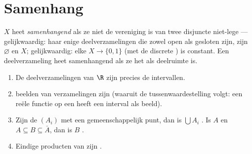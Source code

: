 \section{Samenhang}

\begin{definition}\label{def:b3:topology:connected}
$X$ heet \emph{samenhangend} als ze
niet de vereniging is van twee disjuncte niet-lege  --- gelijkwaardig: haar enige deelverzamelingen die
zowel open als gesloten zijn, zijn $\varnothing$ en $X$;
gelijkwaardig: elke  $X \to \{0, 1\}$ (met de
discrete ) is constant. Een deelverzameling heet
samenhangend als ze het als deelruimte is.
\end{definition}

\begin{theorem}\label{thm:b3:topology:connectedbasics}
\begin{enumerate}
  \item De  deelverzamelingen van $\R$ zijn precies
        de intervallen.
  \item {} beelden van  verzamelingen zijn
         (waaruit de tussenwaardestelling volgt: een
         reële functie op een  heeft
        een interval als beeld).
  \item Zijn de $(A_i)$  met een gemeenschappelijk
        punt, dan is $\bigcup A_i$ . Is $A$
         en $A \subseteq B \subseteq \bar A$, dan is
        $B$ .
  \item Eindige producten van  zijn
        .
\end{enumerate}
\end{theorem}

